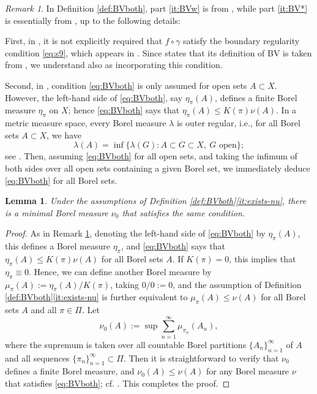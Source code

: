 \documentclass[11pt]{amsart}
\newtheorem{lemma}[theorem]{Lemma}
\theoremstyle{definition}
\theoremstyle{remark}
\newtheorem{remark}[theorem]{Remark}
\numberwithin{equation}{section}
\begin{document}
\begin{remark}\label{rem:BV*}
In Definition \ref{def:BVboth}, part \eqref{it:BVw} is from \cite[Section 5.3]{AD:14}, while
part \eqref{it:BV*} is essentially from \cite[Definition 2.5(a)]{DMS}, up to the following
details:

First, in \cite[Definition 2.5(a)]{DMS}, it is not explicitly required that
$f\circ\gamma$ satisfy the boundary regularity condition
\eqref{eq:s9}, which appears in \cite[(5.14)]{AD:14}. Since \cite[p.\,1859]{DMS} states that
its
definition of BV is taken from \cite{AD:14}, we understand also \cite[Definition
2.5(a)]{DMS} as incorporating this condition.

Second, in \cite[Definition 2.5(a)]{DMS}, condition \eqref{eq:BVboth} is only assumed for
open sets $A\subset X$.
However, the left-hand side of \eqref{eq:BVboth}, say $\eta_\pi(A)$, defines a finite Borel
measure $\eta_\pi$ on $X$; hence \eqref{eq:BVboth} says that $\eta_\pi(A)\leq K(\pi)\nu(A)$.
In a metric measure space, every Borel measure $\lambda$ is outer regular, i.e., for all
Borel sets $A\subset X$, we have
\begin{equation*}
  \lambda(A)=\inf\{\lambda(G):A\subset G\subset X,\ G\text{ open}\};
\end{equation*}
see \cite[Proposition 3.3.37]{HKST:book}. Then, assuming \eqref{eq:BVboth} for all open
sets, and taking the infimum of both sides over all open sets containing a given Borel set,
we immediately deduce \eqref{eq:BVboth} for all Borel sets.
\end{remark}

\begin{lemma}\label{lem:smallest-nu}
Under the assumptions of Definition \ref{def:BVboth}\eqref{it:exists-nu}, there is a minimal
Borel measure $\nu_0$ that satisfies the same condition.
\end{lemma}

\begin{proof}
As in Remark \ref{rem:BV*}, denoting the left-hand side of \eqref{eq:BVboth} by
$\eta_\pi(A)$, this defines a Borel measure $\eta_\pi$, and \eqref{eq:BVboth} says that
$\eta_\pi(A)\leq K(\pi)\nu(A)$ for all Borel sets $A$. If $K(\pi)=0$, this implies that
$\eta_\pi\equiv 0$. Hence, we can define another Borel measure by
$\mu_\pi(A):=\eta_\pi(A)/K(\pi)$, taking $0/0:=0$, and the assumption of Definition
\ref{def:BVboth}\eqref{it:exists-nu} is further equivalent to $\mu_\pi(A)\leq\nu(A)$ for all
Borel sets $A$ and all $\pi\in\Pi$.
Let
\begin{equation*}
  \nu_0(A):=\sup\sum_{n=1}^\infty\mu_{\pi_n}(A_n),
\end{equation*}
where the supremum is taken over all countable Borel partitions $\{A_n\}_{n=1}^\infty$ of
$A$ and
all sequences $\{\pi_n\}_{n=1}^\infty\subset\Pi$. Then it is straightforward to verify that
$\nu_0$ defines a finite Borel measure, and $\nu_0(A)\leq\nu(A)$ for any Borel measure $\nu$
that
satisfies \eqref{eq:BVboth}; cf. \cite[(2.8)]{AILP}. This completes the proof.
\end{proof}
\end{document}
